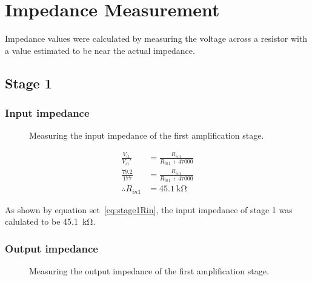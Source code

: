 \documentclass[a4paper,11pt]{article}
\begin{document}
\newpage
\section{Impedance Measurement}
    Impedance values were calculated by measuring the voltage across a resistor with a value estimated to be near the actual impedance.
    
    \subsection{Stage 1}
        \subsubsection{Input impedance}
            \begin{figure}[h]
            \centering
                
                \caption{Measuring the input impedance of the first amplification stage.}
                \label{fig:stage1inputZ}
            \end{figure}
            
            \begin{subequations} \label{eq:stage1Rin}
            \begin{align}
                \frac{V_{i1}}{V_{i1}'} &= \frac{R_{in1}}{R_{in1} + 47000}   \\
                \frac{79.2}{177} &= \frac{R_{in1}}{R_{in1} + 47000}   \\
                \therefore R_{in1} &= \SI{45.1}{\kilo\ohm}
            \end{align}
            \end{subequations}
            
            As shown by equation set~\ref{eq:stage1Rin}, the input impedance of stage 1 was calulated to be \SI{45.1}{\kilo\ohm}.
        
        \subsubsection{Output impedance}
        
            \begin{figure}[h]
            \centering
                
                \caption{Measuring the output impedance of the first amplification stage.}
                \label{fig:stage1outputZ}
            \end{figure}
            
\end{document}
